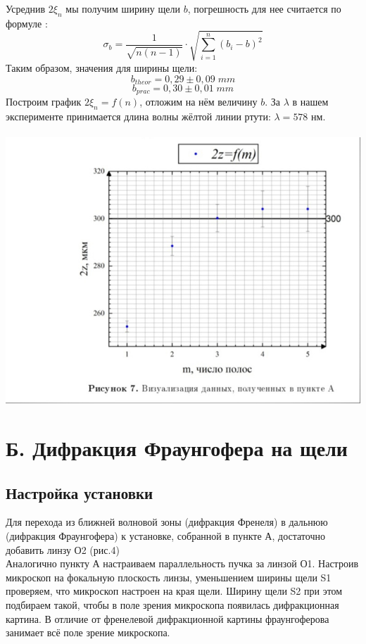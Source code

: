 \documentclass[a4paper]{article}
\begin{document}
Усреднив $2\xi_n$ мы получим ширину щели $b$, погрешность для нее считается по формуле :
$$ \sigma_b = \frac{1}{\sqrt{n(n-1)}} \cdot \sqrt{\sum\limits_{i=1}^n (b_i - b)^2}$$
Таким образом, значения для ширины щели:
$$ b_{theor} = 0,29 \pm 0,09 \; mm$$ 
$$ b_{prac} = 0,30 \pm 0,01 \; mm$$
Построим график $2\xi_n = f(n)$, отложим на нём величину $b$. За $\lambda$ в нашем эксперименте принимается длина волны жёлтой линии ртути: $\lambda = 578$ нм.\\
\\
\includegraphics[width=18cm]{a2}
\section{Б. Дифракция Фраунгофера на щели}
\subsection*{Настройка установки}
Для перехода из ближней волновой зоны (дифракция Френеля) в дальнюю (дифракция Фраунгофера) к установке, собранной в пункте А, достаточно добавить линзу О2 (рис.4)\\
Аналогично пункту А настраиваем параллельность пучка за линзой О1. Настроив микроскоп на фокальную плоскость линзы, уменьшением ширины щели S1 проверяем, что микроскоп настроен на края щели. Ширину щели S2 при этом подбираем такой, чтобы в поле зрения микроскопа появилась дифракционная картина. В отличие от френелевой дифракционной картины фраунгоферова занимает всё поле зрение микроскопа.\\
\end{document}
